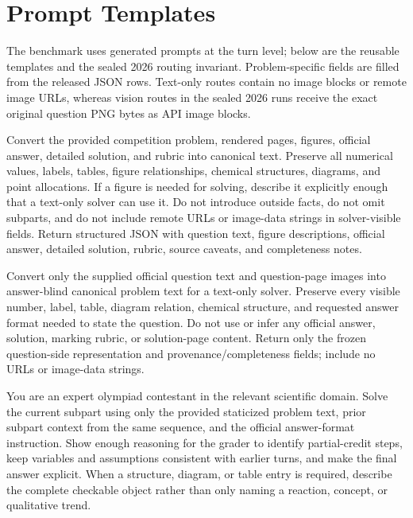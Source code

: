 \documentclass[11pt]{article}
\begin{document}
\section{Prompt Templates}
\label{app:prompts}
The benchmark uses generated prompts at the turn level; below are the reusable templates and the sealed 2026 routing invariant.
Problem-specific fields are filled from the released JSON rows. Text-only routes contain no image blocks or remote image URLs, whereas vision routes in the sealed 2026 runs receive the exact original question PNG bytes as API image blocks.

\begin{tcolorbox}[
  title={Benchmark digitization prompt},
  colback=gray!3,
  colframe=black!35,
  boxrule=0.6pt,
  arc=1.5mm,
  left=1.5mm,right=1.5mm,top=1mm,bottom=1mm
]
\footnotesize
Convert the provided competition problem, rendered pages, figures, official answer, detailed solution, and rubric into canonical text.
Preserve all numerical values, labels, tables, figure relationships, chemical structures, diagrams, and point allocations.
If a figure is needed for solving, describe it explicitly enough that a text-only solver can use it.
Do not introduce outside facts, do not omit subparts, and do not include remote URLs or image-data strings in solver-visible fields.
Return structured JSON with question text, figure descriptions, official answer, detailed solution, rubric, source caveats, and completeness notes.
\end{tcolorbox}

\begin{tcolorbox}[
  title={Sealed 2026 question-only staticization prompt for text routes},
  colback=gray!3,
  colframe=black!35,
  boxrule=0.6pt,
  arc=1.5mm,
  left=1.5mm,right=1.5mm,top=1mm,bottom=1mm
]
\footnotesize
Convert only the supplied official question text and question-page images into answer-blind canonical problem text for a text-only solver.
Preserve every visible number, label, table, diagram relation, chemical structure, and requested answer format needed to state the question.
Do not use or infer any official answer, solution, marking rubric, or solution-page content.
Return only the frozen question-side representation and provenance/completeness fields; include no URLs or image-data strings.
\end{tcolorbox}

\begin{tcolorbox}[
  title={Interleaved solver prompt for open-ended items},
  colback=gray!3,
  colframe=black!35,
  boxrule=0.6pt,
  arc=1.5mm,
  left=1.5mm,right=1.5mm,top=1mm,bottom=1mm
]
\footnotesize
You are an expert olympiad contestant in the relevant scientific domain.
Solve the current subpart using only the provided staticized problem text, prior subpart context from the same sequence, and the official answer-format instruction.
Show enough reasoning for the grader to identify partial-credit steps, keep variables and assumptions consistent with earlier turns, and make the final answer explicit.
When a structure, diagram, or table entry is required, describe the complete checkable object rather than only naming a reaction, concept, or qualitative trend.
\end{tcolorbox}
\end{document}
